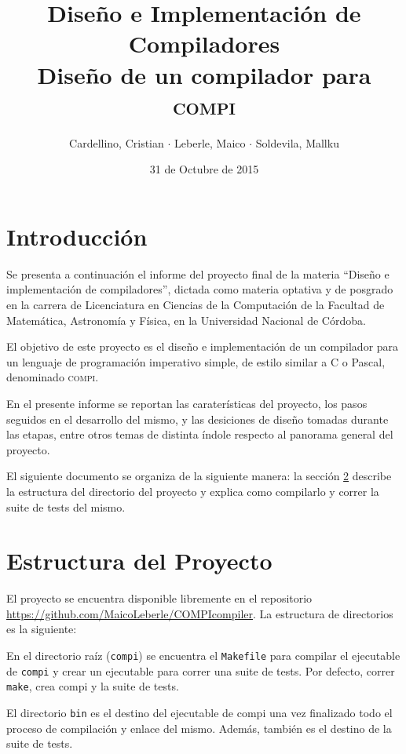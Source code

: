 \documentclass[12pt, a4paper, titlepage]{article}
\title{
  \large{Diseño e Implementación de Compiladores}\\
  \huge{Diseño de un compilador para \textsc{compi}}
}
\author{
  Cardellino, Cristian $\cdot$ Leberle, Maico $\cdot$ Soldevila, Mallku
}
\date{31 de Octubre de 2015}
\begin{document}
  \maketitle

  \section{Introducción}

  Se presenta a continuación el informe del proyecto final de la materia
  ``Diseño e implementación de compiladores'', dictada como materia optativa y
  de posgrado en la carrera de Licenciatura en Ciencias de la Computación de la
  Facultad de Matemática, Astronomía y Física, en la Universidad Nacional de
  Córdoba.

  El objetivo de este proyecto es el diseño e implementación de un compilador
  para un lenguaje de programación imperativo simple, de estilo similar a C o
  Pascal, denominado \textsc{compi}.

  En el presente informe se reportan las caraterísticas del proyecto, los pasos
  seguidos en el desarrollo del mismo, y las desiciones de diseño tomadas
  durante las etapas, entre otros temas de distinta índole respecto al panorama
  general del proyecto.

  El siguiente documento se organiza de la siguiente manera: la sección
  \ref{sec:struct} describe la estructura del directorio del proyecto y explica
  como compilarlo y correr la suite de tests del mismo.

  \section{Estructura del Proyecto}\label{sec:struct}

  El proyecto se encuentra disponible libremente en el repositorio
  \url{https://github.com/MaicoLeberle/COMPIcompiler}. La estructura de
  directorios es la siguiente:


  En el directorio raíz ({\tt compi}) se encuentra el {\tt Makefile} para
  compilar el ejecutable de {\tt compi} y crear un ejecutable para correr una
  suite de tests. Por defecto, correr {\tt make}, crea compi y la suite de
  tests.

  El directorio {\tt bin} es el destino del ejecutable de {\sc compi} una vez
  finalizado todo el proceso de compilación y enlace del mismo. Además, también
  es el destino de la suite de tests.
\end{document}
